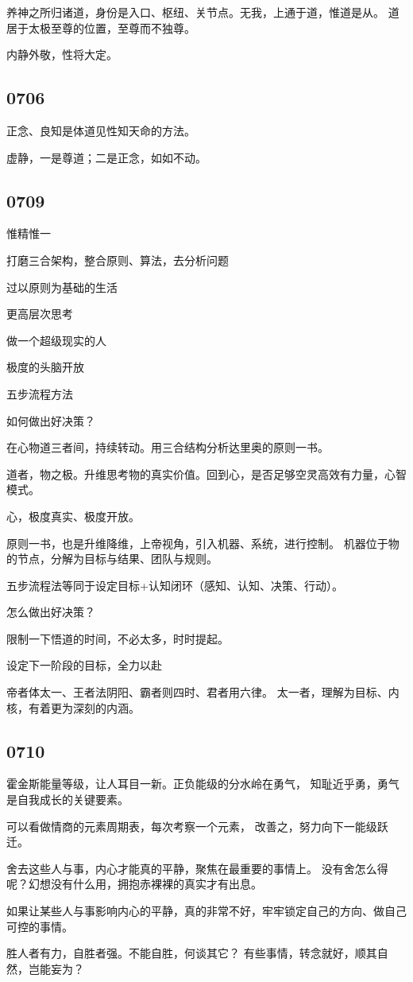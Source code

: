 养神之所归诸道，身份是入口、枢纽、关节点。无我，上通于道，惟道是从。
道居于太极至尊的位置，至尊而不独尊。

内静外敬，性将大定。

\subsection{0706}

正念、良知是体道见性知天命的方法。

虚静，一是尊道；二是正念，如如不动。

\subsection{0709}

惟精惟一

打磨三合架构，整合原则、算法，去分析问题

\begin{enumbox}
\item 过以原则为基础的生活
\item 更高层次思考
\item 做一个超级现实的人
\item 极度的头脑开放
\item 五步流程方法
\item 如何做出好决策？
\end{enumbox}

在心物道三者间，持续转动。用三合结构分析达里奥的原则一书。

道者，物之极。升维思考物的真实价值。回到心，是否足够空灵高效有力量，心智模式。

心，极度真实、极度开放。

原则一书，也是升维降维，上帝视角，引入机器、系统，进行控制。
机器位于物的节点，分解为目标与结果、团队与规则。

五步流程法等同于设定目标+认知闭环（感知、认知、决策、行动）。

怎么做出好决策？

限制一下悟道的时间，不必太多，时时提起。

设定下一阶段的目标，全力以赴

帝者体太一、王者法阴阳、霸者则四时、君者用六律。
太一者，理解为目标、内核，有着更为深刻的内涵。

\subsection{0710}

霍金斯能量等级，让人耳目一新。正负能级的分水岭在勇气，
知耻近乎勇，勇气是自我成长的关键要素。

可以看做情商的元素周期表，每次考察一个元素，
改善之，努力向下一能级跃迁。

舍去这些人与事，内心才能真的平静，聚焦在最重要的事情上。
没有舍怎么得呢？幻想没有什么用，拥抱赤裸裸的真实才有出息。

如果让某些人与事影响内心的平静，真的非常不好，牢牢锁定自己的方向、做自己可控的事情。

胜人者有力，自胜者强。不能自胜，何谈其它？
有些事情，转念就好，顺其自然，岂能妄为？
